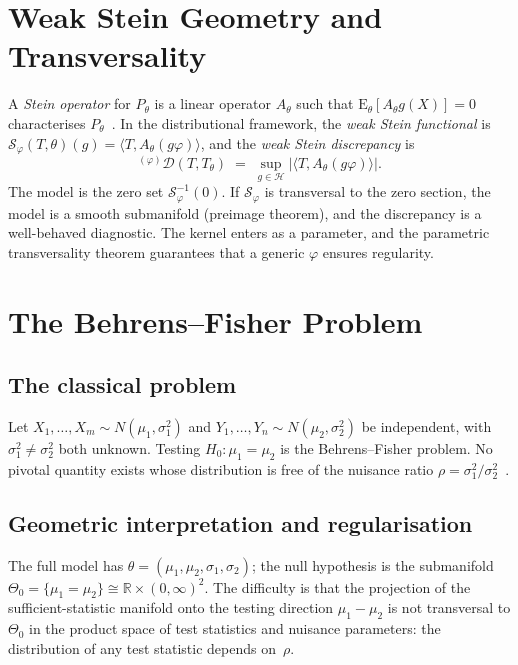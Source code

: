 \documentclass[11pt,a4paper]{article}
\newcommand{\E}{\mathrm{E}}
\newcommand{\R}{\mathbb{R}}
\begin{document}
\section{Weak Stein Geometry and Transversality}
\label{sec:stein}

A \emph{Stein operator} for $P_\theta$ is a linear operator
$A_\theta$ such that $\E_\theta[A_\theta g(X)]=0$ characterises
$P_\theta$~\cite{Stein1972,SteinChenGoldstein2004}.  In the
distributional framework, the \emph{weak Stein functional} is
$\mathcal{S}_\varphi(T,\theta)(g) =
\langle T, A_\theta(g\varphi)\rangle$, and the \emph{weak Stein
discrepancy} is
\[
  {}^{(\varphi)}\mathcal{D}(T,T_\theta)
  \;=\;
  \sup_{g\in\mathcal{H}}
  |\langle T, A_\theta(g\varphi)\rangle|.
\]
The model is the zero set $\mathcal{S}_\varphi^{-1}(0)$.
If $\mathcal{S}_\varphi$ is transversal to the zero section, the
model is a smooth submanifold (preimage theorem), and the discrepancy
is a well-behaved diagnostic.  The kernel enters as a parameter, and
the parametric transversality theorem guarantees that a generic
$\varphi$ ensures regularity.


\section{The Behrens--Fisher Problem}
\label{sec:behrens_fisher}

\subsection{The classical problem}

Let $X_1,\ldots,X_m\sim N(\mu_1,\sigma_1^2)$ and
$Y_1,\ldots,Y_n\sim N(\mu_2,\sigma_2^2)$ be independent, with
$\sigma_1^2\neq\sigma_2^2$ both unknown.  Testing $H_0:\mu_1=\mu_2$
is the Behrens--Fisher problem.  No pivotal quantity exists whose
distribution is free of the nuisance ratio
$\rho=\sigma_1^2/\sigma_2^2$~\cite{Fisher1935,Fisher1939,
Jeffreys1961,Welch1947}.

\subsection{Geometric interpretation and regularisation}

The full model has $\theta=(\mu_1,\mu_2,\sigma_1,\sigma_2)$; the null
hypothesis is the submanifold
$\Theta_0 = \{\mu_1=\mu_2\}\cong\R\times(0,\infty)^2$.  The
difficulty is that the projection of the sufficient-statistic manifold
onto the testing direction $\mu_1-\mu_2$ is not transversal to
$\Theta_0$ in the product space of test statistics and nuisance
parameters: the distribution of any test statistic depends on~$\rho$.
\end{document}
